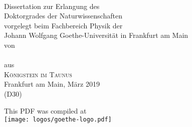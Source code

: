 %

\thispagestyle{empty}
\begin{fullwidth} %
	\begin{center}
		\phantom{empty}
		\vspace{2cm}
		\Huge \textcolor{black!90}{\textbf{\thetitle}} \\
		\Large
		\vspace{1.9cm}
			Dissertation zur Erlangung des \\
			Doktorgrades der Naturwissenschaften \\
			\vspace{1.9cm}
			vorgelegt beim Fachbereich Physik der \\
			Johann Wolfgang Goethe-Universität in Frankfurt am Main \\
		\vspace{1.9cm}
		von\\
		\textsc{\theauthor} \\
		aus \\
		\textsc{Königstein im Taunus} \\
		\vspace{.9cm} 
		Frankfurt am Main, März 2019 \\
		(D30)
		\vspace{1.2cm}
		
		\ifdefined\releasemode\else
		\colorbox{red!40}{This PDF was compiled at {\bf \thedate}}\\[5ex]
		\fi
		\vfill{}
		\texttt{[image: logos/goethe-logo.pdf]}
	\end{center}
	
\newpage %
\end{fullwidth}
	\Large
	
